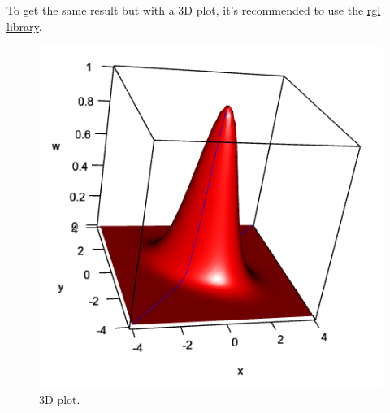 \documentclass[a4paper]{article}
\begin{document}
    \noindent
    To get the same result but with a 3D plot, it's recommended to use the \href{https://cran.r-project.org/web/packages/rgl/index.html}{rgl library}.
    
    \begin{figure}[!htp]
        \centering
        \includegraphics[width=.6\textwidth]{img/3d-plots-func-for-new-libs-5.png}
        \caption*{3D plot.}
    \end{figure}




















    \newpage

    {}
    

    \newpage

    \printindex
\end{document}
